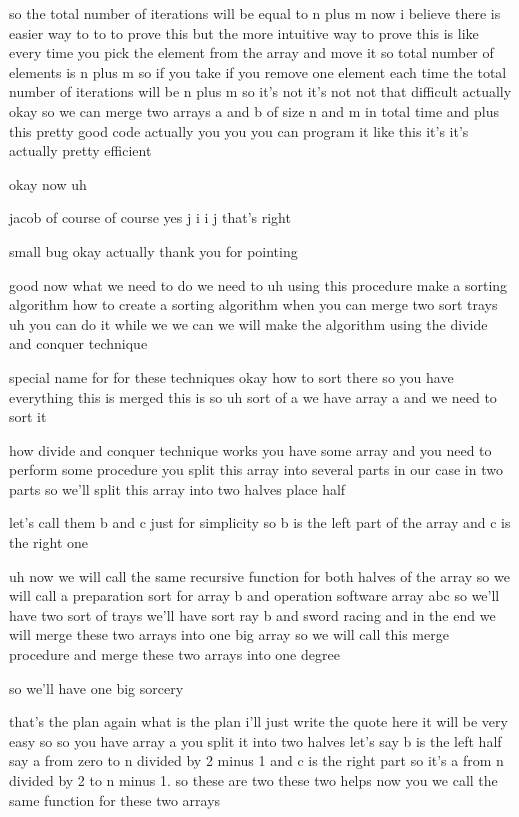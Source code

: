 so the total number of iterations will be equal to n plus m now i believe there is easier way to to to prove this but the more intuitive way to prove this is like every time you pick the element from the array and move it so total number of elements is n plus m so if you take if you remove one element each time the total number of iterations will be n plus m so it's not it's not not that difficult actually okay so we can merge two arrays a and b of size n and m in total time and plus this pretty good code actually you you you can program it like this it's it's actually pretty efficient

okay now uh

jacob of course of course yes j i i j that's right

small bug okay actually thank you for pointing

good now what we need to do we need to uh using this procedure make a sorting algorithm how to create a sorting algorithm when you can merge two sort trays uh you can do it while we we can we will make the algorithm using the divide and conquer technique

special name for for these techniques okay how to sort there so you have everything this is merged this is so uh sort of a we have array a and we need to sort it

how divide and conquer technique works you have some array and you need to perform some procedure you split this array into several parts in our case in two parts so we'll split this array into two halves place half

let's call them b and c just for simplicity so b is the left part of the array and c is the right one

uh now we will call the same recursive function for both halves of the array so we will call a preparation sort for array b and operation software array abc so we'll have two sort of trays we'll have sort ray b and sword racing and in the end we will merge these two arrays into one big array so we will call this merge procedure and merge these two arrays into one degree

so we'll have one big sorcery

that's the plan again what is the plan i'll just write the quote here it will be very easy so so you have array a you split it into two halves let's say b is the left half say a from zero to n divided by 2 minus 1 and c is the right part so it's a from n divided by 2 to n minus 1. so these are two these two helps now you we call the same function for these two arrays

